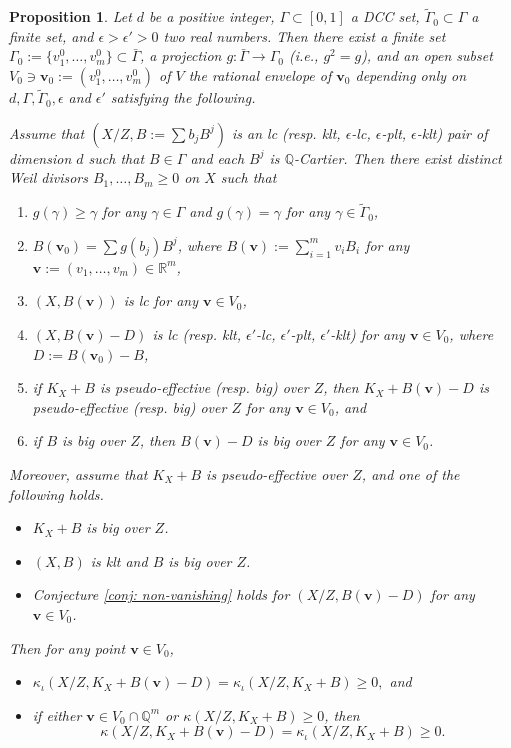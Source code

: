 \documentclass[11pt]{amsart}
\numberwithin{equation}{section}
\newcommand{\Qq}{\mathbb{Q}}
\newcommand{\Rr}{\mathbb{R}}
\newcommand{\Ii}{{\Gamma}}
\newtheorem{prop}[thm]{Proposition}
\theoremstyle{definition}
\theoremstyle{definition}
\begin{document}
\begin{prop}\label{prop: main prop perturb dcc}
Let $d$ be a positive integer, $\Ii\subset [0,1]$ a DCC set, $\tilde\Ii_0\subset\Ii$ a finite set, and $\epsilon>\epsilon'>0$ two real numbers. Then there exist a finite set $\Ii_0:=\{v^0_1,\dots,v^0_m\}\subset\bar\Ii$, a projection $g: \bar{\Ii}\rightarrow\Ii_0$ (i.e., $g^2=g$), and an open subset $V_0\ni\bm{v}_0:=(v^0_1,\dots,v^0_m)$ of $V$ the rational envelope of $\bm{v}_0$ depending only on $d,\Ii,\tilde\Ii_0,\epsilon$ and $\epsilon'$ satisfying the following. 

Assume that $(X/Z,B:=\sum b_jB^j)$ is an lc (resp. klt, $\epsilon$-lc, $\epsilon$-plt, $\epsilon$-klt) pair of dimension $d$ such that $B\in\Ii$ and each $B^j$ is $\Qq$-Cartier. Then there exist distinct Weil divisors $B_1,\dots, B_m\geq 0$ on $X$ such that
\begin{enumerate}
  \item $g(\gamma)\geq\gamma$ for any $\gamma\in\Ii$ and $g(\gamma)=\gamma$ for any $\gamma\in\tilde\Ii_0$,
  \item $B(\bm{v}_0)=\sum g(b_j)B^j$, where $B(\bm{v}):=\sum_{i=1}^mv_iB_i$ for any $\bm{v}:=(v_1,\dots,v_m)\in\Rr^m$,
  \item $(X,B(\bm{v}))$ is lc for any $\bm{v}\in V_0$,
  \item $(X,B(\bm{v})-D)$ is lc (resp. klt, $\epsilon'$-lc, $\epsilon'$-plt, $\epsilon'$-klt) for any $\bm{v}\in V_0$, where $D:=B(\bm{v}_0)-B$,
  \item if $K_X+B$ is pseudo-effective (resp. big) over $Z$, then $K_X+B(\bm{v})-D$ is pseudo-effective (resp. big) over $Z$ for any $\bm{v}\in V_0$, and
  \item if $B$ is big over $Z$, then $B(\bm{v})-D$ is big over $Z$ for any $\bm{v}\in V_0$.
\end{enumerate}
Moreover, assume that $K_X+B$ is pseudo-effective over $Z$, and one of the following holds.
\begin{itemize}
  \item $K_X+B$ is big over $Z$.
  \item $(X,B)$ is klt and $B$ is big over $Z$.
  \item Conjecture \ref{conj: non-vanishing} holds for $(X/Z,B(\bm{v})-D)$ for any $\bm{v}\in V_0$.
\end{itemize}
Then for any point $\bm{v}\in V_0$,
\begin{itemize}
  \item[(7)] $\kappa_{\iota}(X/Z,K_X+B(\bm{v})-D)=\kappa_{\iota}(X/Z,K_X+B)\geq 0,$ and
  \item[(8)] if either $\bm{v}\in V_0\cap\Qq^m$ or $\kappa(X/Z,K_X+B)\geq 0$, then $$\kappa(X/Z,K_X+B(\bm{v})-D)=\kappa_{\iota}(X/Z,K_X+B)\geq 0.$$
\end{itemize}
\end{prop}
\end{document}
